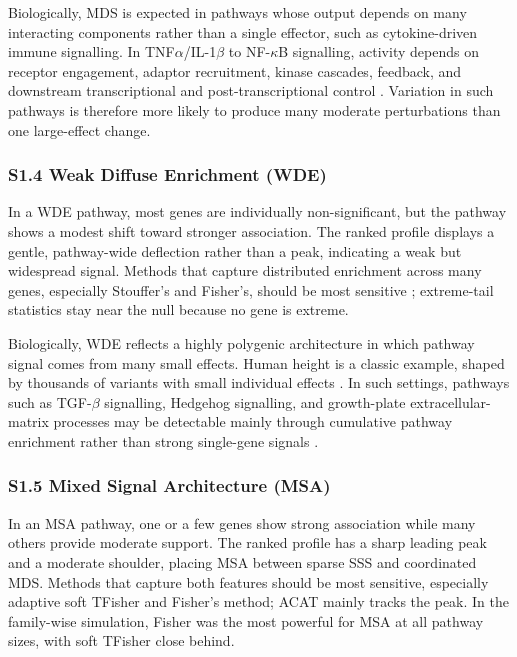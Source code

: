 Biologically, MDS is expected in pathways whose output depends on many interacting components rather than a single effector, such as cytokine-driven immune signalling. In TNF$\alpha$/IL-1$\beta$ to NF-$\kappa$B signalling, activity depends on receptor engagement, adaptor recruitment, kinase cascades, feedback, and downstream transcriptional and post-transcriptional control \citep{Jiang2021CytoSig,Megha2021Inflammation,Verstrepen2008NFkB,vanLoo2011NFkB,Cargnello2011MAPK}. Variation in such pathways is therefore more likely to produce many moderate perturbations than one large-effect change.

\subsubsection*{S1.4 Weak Diffuse Enrichment (WDE)}

In a WDE pathway, most genes are individually non-significant, but the pathway shows a modest shift toward stronger association. The ranked profile displays a gentle, pathway-wide deflection rather than a peak, indicating a weak but widespread signal. Methods that capture distributed enrichment across many genes, especially Stouffer’s and Fisher’s, should be most sensitive \citep{deLeeuw2015}; extreme-tail statistics stay near the null because no gene is extreme.

Biologically, WDE reflects a highly polygenic architecture in which pathway signal comes from many small effects. Human height is a classic example, shaped by thousands of variants with small individual effects \citep{Guo2018HeightGWAS,Yengo2022HeightSaturation}. In such settings, pathways such as TGF-$\beta$ signalling, Hedgehog signalling, and growth-plate extracellular-matrix processes may be detectable mainly through cumulative pathway enrichment rather than strong single-gene signals \citep{LangoAllen2010Height,Guo2018HeightGWAS}.

\subsubsection*{S1.5 Mixed Signal Architecture (MSA)}

In an MSA pathway, one or a few genes show strong association while many others provide moderate support. The ranked profile has a sharp leading peak and a moderate shoulder, placing MSA between sparse SSS and coordinated MDS. Methods that capture both features should be most sensitive, especially adaptive soft TFisher and Fisher’s method; ACAT mainly tracks the peak. In the family-wise simulation, Fisher was the most powerful for MSA at all pathway sizes, with soft TFisher close behind.

